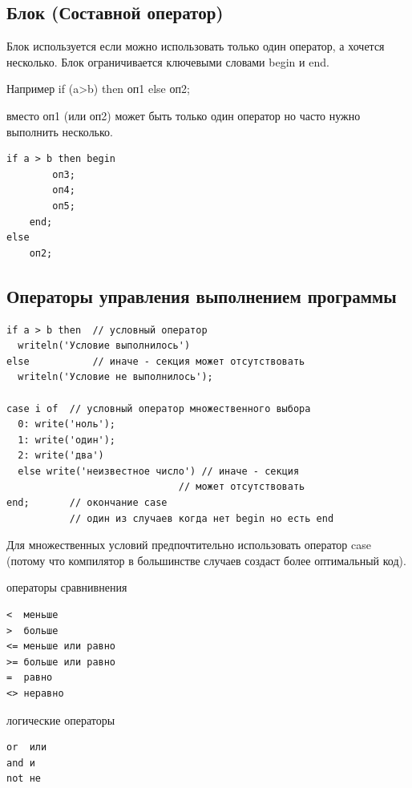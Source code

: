 \documentclass[unicode, 12pt, a4paper,oneside,fleqn]{article}
\begin{document}
\subsection{Блок (Составной оператор)}
Блок используется если можно использовать только один оператор, а
хочется несколько. Блок ограничивается ключевыми словами begin и end. 

Например if (a>b) then оп1 else оп2;

вместо оп1 (или оп2) может быть только один оператор но часто нужно
выполнить несколько.
\begin{verbatim}
if a > b then begin
        оп3;
        оп4;
        оп5;
    end;
else
    оп2;
\end{verbatim}




\subsection{Операторы управления выполнением программы}
\begin{verbatim}
if a > b then  // условный оператор
  writeln('Условие выполнилось')
else           // иначе - секция может отсутствовать
  writeln('Условие не выполнилось');

case i of  // условный оператор множественного выбора
  0: write('ноль');
  1: write('один');
  2: write('два')
  else write('неизвестное число') // иначе - секция
                              // может отсутствовать
end;       // окончание case
           // один из случаев когда нет begin но есть end
\end{verbatim}

Для множественных условий предпочтительно использовать оператор case (потому что компилятор в большинстве случаев создаст более оптимальный код).

операторы сравнивнения
\begin{verbatim}
<  меньше
>  больше
<= меньше или равно
>= больше или равно
=  равно
<> неравно
\end{verbatim}

логические операторы
\begin{verbatim}
or  или
and и
not не
\end{verbatim}
\end{document}
